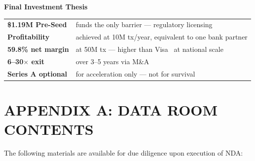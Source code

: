 \documentclass[11pt,a4paper]{article}
\begin{document}
\vspace{0.8em}
\begin{tcolorbox}[keymetric]
\centering
\vspace{0.4em}
{\large\bfseries\color{accent} Final Investment Thesis}\\[0.8em]
\begin{tabular}{@{}p{5.2cm}p{8.8cm}@{}}
\textbf{\$1.19M Pre-Seed} & funds the only barrier --- regulatory licensing~\cite{lb_emi,mica_reg} \\[6pt]
\textbf{Profitability}              & achieved at 10M tx/year, equivalent to one bank partner \\[6pt]
\textbf{59.8\% net margin}          & at 50M tx --- higher than Visa~\cite{visa_ar} at national scale \\[6pt]
\textbf{6--30$\times$ exit}         & over 3--5 years via M\&A~\cite{worldline_ar,adyen_ar,bnp_ar,ing_ar} \\[6pt]
\textbf{Series A optional}          & for acceleration only --- not for survival \\
\end{tabular}
\vspace{0.4em}
\end{tcolorbox}


\section*{APPENDIX A: DATA ROOM CONTENTS}

The following materials are available for due diligence upon execution of NDA:
\end{document}
